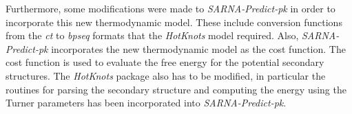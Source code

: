 \documentclass{doublecol-new}
\theoremstyle{TH}{
\newtheorem{lemma}{Lemma}
\newtheorem{theorem}[lemma]{Theorem}
\newtheorem{corrolary}[lemma]{Corrolary}
\newtheorem{conjecture}[lemma]{Conjecture}
\newtheorem{proposition}[lemma]{Proposition}
\newtheorem{claim}[lemma]{Claim}
\newtheorem{stheorem}[lemma]{Wrong Theorem}
\newtheorem{algorithm}{Algorithm}
}
\theoremstyle{THrm}{
\newtheorem{definition}{Definition}
\newtheorem{question}{Question}
\newtheorem{remark}{Remark}
\newtheorem{scheme}{Scheme}
}
\theoremstyle{THhit}{
\newtheorem{case}{Case}[section]
}
\begin{document}
Furthermore, some modifications were made to {\em SARNA-Predict-pk} in order to
incorporate this new thermodynamic model. These include conversion functions from
the {\em ct} to {\em bpseq} formats that the {\em HotKnots} model required.
Also, {\em SARNA-Predict-pk} incorporates the new thermodynamic model as the
cost function. The cost function is used to evaluate the free energy
for the potential secondary structures. The {\em HotKnots} package
also has to be modified, in particular the routines for parsing the
secondary structure and computing the energy using the Turner
parameters has been incorporated into {\em SARNA-Predict-pk}.


%

\end{document}
